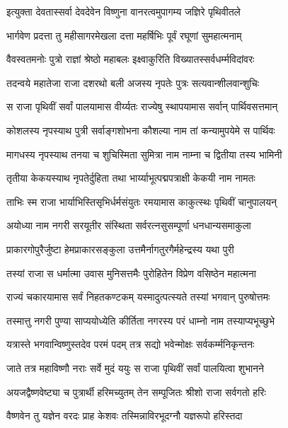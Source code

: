 
\twolineshloka
{इत्युक्ता देवतास्सर्वा देवदेवेन विष्णुना}
{वानरत्वमुपागम्य जज्ञिरे पृथिवीतले}%

\twolineshloka
{भार्गवेण प्रदत्ता तु महीसागरमेखला}
{दत्ता महर्षिभिः पूर्वं रघूणां सुमहात्मनाम्}%

\twolineshloka
{वैवस्वतमनोः पुत्रो राज्ञां श्रेष्ठो महाबलः}
{इक्ष्वाकुरिति विख्यातस्सर्वधर्म्मविदांवरः}%

\twolineshloka
{तदन्वये महातेजा राजा दशरथो बली}
{अजस्य नृपतेः पुत्रः सत्यवान्शीलवान्शुचिः}%

\twolineshloka
{स राजा पृथिवीं सर्वां पालयामास वीर्य्यतः}
{राज्येषु स्थापयामास सर्वान् पार्थिवसत्तमान्}%

\twolineshloka
{कोशलस्य नृपस्याथ पुत्री सर्वाङ्गशोभना}
{कौशल्या नाम तां कन्यामुपयेमे स पार्थिवः}%

\twolineshloka
{मागधस्य नृपस्याथ तनया च शुचिस्मिता}
{सुमित्रा नाम नाम्ना च द्वितीया तस्य भामिनी}%

\twolineshloka
{तृतीया केकयस्याथ नृपतेर्दुहिता तथा}
{भार्य्याभूत्पद्मपत्राक्षी केकयी नाम नामतः}%

\twolineshloka
{ताभिः स्म राजा भार्याभिस्तिसृभिर्धर्मसंयुतः}
{रमयामास काकुत्स्थः पृथिवीं चानुपालयन्}%

\twolineshloka
{अयोध्या नाम नगरी सरयूतीर संस्थिता}
{सर्वरत्नसुसम्पूर्णा धनधान्यसमाकुला}%

\twolineshloka
{प्राकारगोपुरैर्जुष्टा हेमप्राकारसङ्कुला}
{उत्तमैर्नागतुरगैर्महेन्द्रस्य यथा पुरी}%

\twolineshloka
{तस्यां राजा स धर्मात्मा उवास मुनिसत्तमैः}
{पुरोहितेन विप्रेण वसिष्ठेन महात्मना}%

\twolineshloka
{राज्यं चकारयामास सर्वं निहतकण्टकम्}
{यस्मादुत्पत्स्यते तस्यां भगवान् पुरुषोत्तमः}%

\twolineshloka
{तस्मात्तु नगरी पुण्या साप्ययोध्येति कीर्तिता}
{नगरस्य परं धाम्नो नाम तस्याप्यभूच्छुभे}%

\twolineshloka
{यत्रास्ते भगवान्विष्णुस्तदेव परमं पदम्}
{तत्र सद्यो भवेन्मोक्षः सर्वकर्म्मनिकृन्तनः}%

\twolineshloka
{जाते तत्र महाविष्णौ नराः सर्वे मुदं ययुः}
{स राजा पृथिवीं सर्वां पालयित्वा शुभानने}%

\twolineshloka
{अयजद्वैष्णवेष्ट्या च पुत्रार्थी हरिमच्युतम्}
{तेन सम्पूजितः श्रीशो राजा सर्वगतो हरिः}%

\twolineshloka
{वैष्णवेन तु यज्ञेन वरदः प्राह केशवः}
{तस्मिन्नाविरभूदग्नौ यज्ञरूपो हरिस्तदा}%

